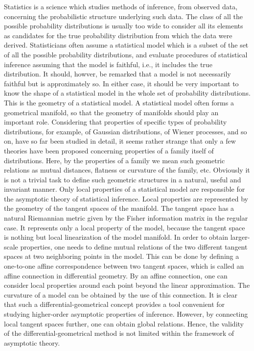 \documentclass[11pt]{article}
\begin{document}
            Statistics is a science which studies methods of inference, from
observed data, concerning the probabilistic structure underlying such data.
The class of all the possible probability distributions is usually too wide to
consider all its elements as candidates for the true probability distribution
from which the data were derived.  Statisticians often assume a statistical
model which is a subset of the set of all the possible probability distribut{ions,}
      and evaluate procedures of statistical inference assuming that the model
is faithful, i.e., it includes the true distribution.  It should, howver, be
remarked that a model is not necessarily faithful but is approximately so.  In
either case, it should be very important to know the shape of a statistical
model in the whole set of probability distributions.  This is the geometry of a
statistical model.  A statistical model often forms a geometrical manifold, so
that the geometry of manifolds should play an important role.  Considering that
properties of specific types of probability distributions, for example, of
Gaussian distributions, of Wiener processes, and so on, have so far been studied
in detail, it seems rather strange that only a few theories have been proposed
concerning properties of a family itself of distributions.  Here, by the proper{ties}
     of a family we mean such geometric relations as mutual distances, flatness
or curvature of the family, etc.  Obviously it is not a trivial task to define 
such geometric structures in a natural, useful and invariant manner.
            Only local properties of a statistical model are responsible for the
asymptotic theory of statistical inference.  Local properties are represented
by the geometry of the tangent spaces of the manifold.  The tangent space has a
natural Riemannian metric given by the Fisher information matrix in the regular
case.  It represents only a local property of the model, because the tangent
space is nothing but local linearization of the model manifold.  In order to
obtain larger-scale properties, one needs to define mutual relations of the two
different tangent spaces at two neighboring points in the model.  This can be
done by defining a one-to-one affine correspondence between two tangent spaces,
which is called an affine connection in differential geometry.  By an affine
connection, one can consider local properties around each point beyond the
linear approximation.  The curvature of a model can be obtained by the use of
this connection.  It is clear that such a differential-geometrical concept pro{vides}
      a tool convenient for studying higher-order asymptotic properties of
inference.  However, by connecting local tangent spaces further, one can obtain
global relations.  Hence, the validity of the differential-geometrical method is
not limited within the framework of asymptotic theory.
\end{document}
